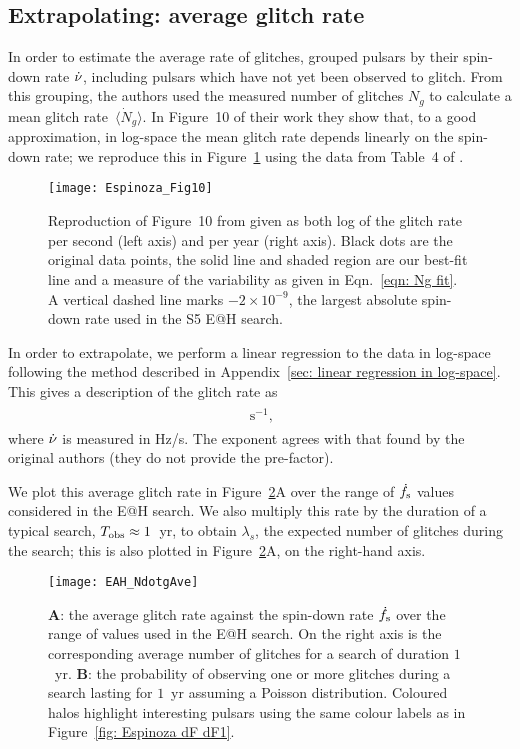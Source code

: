\documentclass[../full_thesis/full_thesis.tex]{subfiles}
\newcommand{\thisdir}{../glitches_in_CGW}
\begin{document}
\subsection{Extrapolating: average glitch rate}
\label{sec: average glitch frequency}
In order to estimate the average rate of glitches, \citet{Espinoza2011}
grouped pulsars by their spin-down rate $\dot{\nu}$, including pulsars
which have not yet been observed to glitch. From this grouping, the authors
used the measured number of glitches $N_{g}$ to calculate a mean
glitch rate~$\langle \dot{N}_{g}\rangle$. In Figure~10 of their work they
show that, to a good approximation, in log-space the mean glitch rate depends linearly on the spin-down rate;
we reproduce this in Figure~\ref{fig: Espinoza 10} using the data from Table~4
of \citet{Espinoza2011}.
\begin{figure}[htb]
\centering
\texttt{[image: Espinoza\_Fig10]}
\caption{Reproduction of Figure~10 from \citet{Espinoza2011} given as both log of
the glitch rate per second (left axis) and per year (right axis). Black
dots are the original data points, the solid line and shaded region are
our best-fit line and a measure of the variability as given in Eqn.~\eqref{eqn:
Ng fit}. A vertical dashed line marks $-2\times10^{-9}$, the largest absolute
spin-down rate used in the S5 E@H search.}
\label{fig: Espinoza 10}
\end{figure}

In order to extrapolate, we perform a linear regression to the data in
log-space following the method described in Appendix~\ref{sec: linear
regression in log-space}.  This gives a description of the glitch rate as
\begin{align}
\begin{split}

\textrm{ s}^{-1},
\end{split}
\label{eqn: Ng fit}
\end{align}
where $\dot{\nu}$ is measured in Hz/s.  The exponent agrees with that found by
the original authors (they do not provide the pre-factor).

We plot this average glitch rate in Figure~\ref{fig: EAH_NdotgAve}A over the
range of $\dot{f}_{\textrm{s}}$ values considered in the E@H search. We also multiply this
rate by the duration of a typical search, $T_{\mathrm{obs}}\approx1$~yr, to obtain
$\lambda_{s}$, the expected number of glitches during the search; this is
also plotted in Figure~\ref{fig: EAH_NdotgAve}A, on the right-hand axis.

\begin{figure}[htb]
\centering
\texttt{[image: EAH\_NdotgAve]}
\caption{\textbf{A}: the average glitch rate against the spin-down rate
$\dot{f}_{\textrm{s}}$ over the range of values used in the E@H search. On the right axis is
the corresponding average number of glitches for a search of duration $1$~yr.
\textbf{B}: the probability of observing one or
more glitches during a search lasting for $1$~yr assuming a Poisson distribution. Coloured
halos highlight interesting pulsars using the same colour labels as in
Figure~\ref{fig: Espinoza dF dF1}.}
\label{fig: EAH_NdotgAve}
\end{figure}
\end{document}
